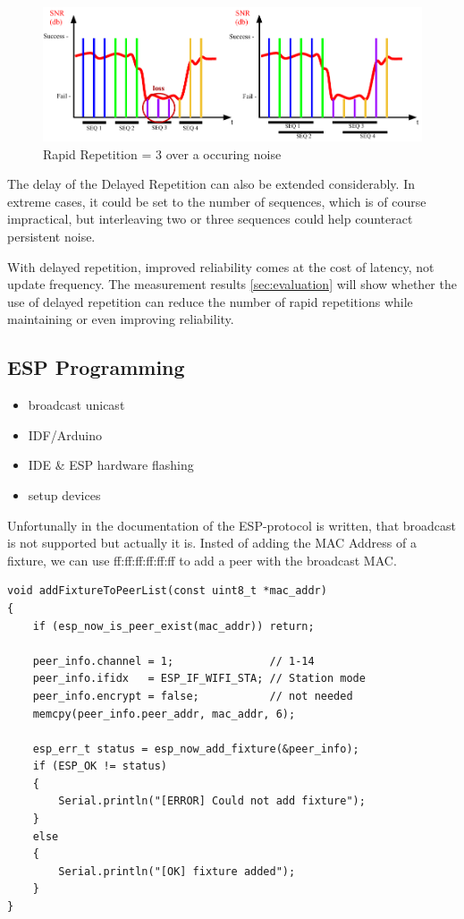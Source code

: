 \begin{figure}[h]
	\includegraphics[scale=0.75]{figures/BadChannel.pdf}
	\caption{Rapid Repetition = 3 over a occuring noise}
	\label{fig:badChannel}
\end{figure}

The delay of the Delayed Repetition can also be extended considerably.
In extreme cases, it could be set to the number of sequences, which is of course impractical,
but interleaving two or three sequences could help counteract persistent noise.

With delayed repetition, improved reliability comes at the cost of latency, not update frequency.
The measurement results \cref{sec:evaluation} will show whether the use of delayed repetition can reduce the number of rapid repetitions 
while maintaining or even improving reliability.

\subsection{ESP Programming}
\begin{itemize}
	\item broadcast unicast
	\item IDF/Arduino
	\item IDE \& ESP hardware flashing
	\item setup devices
\end{itemize}


Unfortunally in the documentation of the ESP-protocol is written, that broadcast is not supported 
but actually it is. Insted of adding the \ac{MAC} Address of a fixture, we can use 
 ff:ff:ff:ff:ff:ff 
to add a peer with the broadcast \ac{MAC}.

\label{lst:shorttable}
\begin{lstlisting}
void addFixtureToPeerList(const uint8_t *mac_addr) 
{
	if (esp_now_is_peer_exist(mac_addr)) return;

	peer_info.channel = 1;               // 1-14
	peer_info.ifidx   = ESP_IF_WIFI_STA; // Station mode
	peer_info.encrypt = false;         	 // not needed
	memcpy(peer_info.peer_addr, mac_addr, 6);

	esp_err_t status = esp_now_add_fixture(&peer_info);
	if (ESP_OK != status) 
	{
		Serial.println("[ERROR] Could not add fixture");
	}
	else 
	{
		Serial.println("[OK] fixture added");
	}
}
\end{lstlisting}
% 

